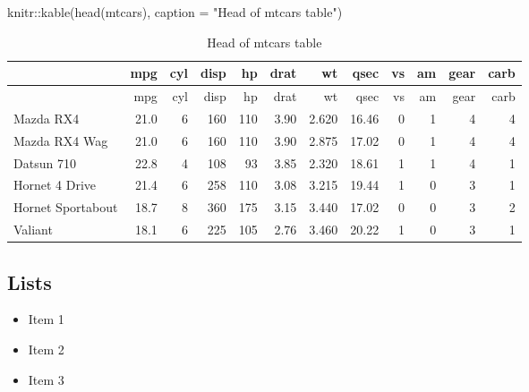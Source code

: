 \documentclass{article}
\newenvironment{Shaded}{\begin{snugshade}}{\end{snugshade}}
\newcommand{\AttributeTok}[1]{\textcolor[rgb]{0.77,0.63,0.00}{#1}}
\newcommand{\FunctionTok}[1]{\textcolor[rgb]{0.00,0.00,0.00}{#1}}
\newcommand{\NormalTok}[1]{#1}
\newcommand{\SpecialCharTok}[1]{\textcolor[rgb]{0.00,0.00,0.00}{#1}}
\newcommand{\StringTok}[1]{\textcolor[rgb]{0.31,0.60,0.02}{#1}}
\providecommand{\tightlist}{%
  \setlength{\itemsep}{0pt}\setlength{\parskip}{0pt}}
\begin{document}
\begin{Shaded}
\begin{Highlighting}[]
\NormalTok{knitr}\SpecialCharTok{::}\FunctionTok{kable}\NormalTok{(}\FunctionTok{head}\NormalTok{(mtcars), }\AttributeTok{caption =} \StringTok{"Head of mtcars table"}\NormalTok{)}
\end{Highlighting}
\end{Shaded}

\begin{longtable}[]{@{}lrrrrrrrrrrr@{}}
\caption{Head of mtcars table}\tabularnewline
\toprule
& mpg & cyl & disp & hp & drat & wt & qsec & vs & am & gear & carb \\
\midrule
\endfirsthead
\toprule
& mpg & cyl & disp & hp & drat & wt & qsec & vs & am & gear & carb \\
\midrule
\endhead
Mazda RX4 & 21.0 & 6 & 160 & 110 & 3.90 & 2.620 & 16.46 & 0 & 1 & 4 &
4 \\
Mazda RX4 Wag & 21.0 & 6 & 160 & 110 & 3.90 & 2.875 & 17.02 & 0 & 1 & 4
& 4 \\
Datsun 710 & 22.8 & 4 & 108 & 93 & 3.85 & 2.320 & 18.61 & 1 & 1 & 4 &
1 \\
Hornet 4 Drive & 21.4 & 6 & 258 & 110 & 3.08 & 3.215 & 19.44 & 1 & 0 & 3
& 1 \\
Hornet Sportabout & 18.7 & 8 & 360 & 175 & 3.15 & 3.440 & 17.02 & 0 & 0
& 3 & 2 \\
Valiant & 18.1 & 6 & 225 & 105 & 2.76 & 3.460 & 20.22 & 1 & 0 & 3 & 1 \\
\bottomrule
\end{longtable}

\hypertarget{lists}{%
\subsection{Lists}\label{lists}}

\begin{itemize}
\tightlist
\item
  Item 1
\item
  Item 2
\item
  Item 3
\end{itemize}
\end{document}
